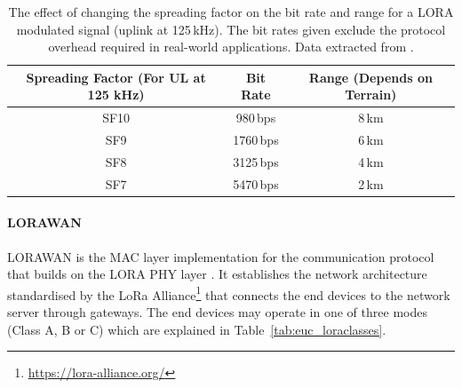 \begin{table}[h!]
    \centering
    \begin{tabular}{c c c}
    \hline
        \textbf{Spreading Factor} (For UL at 125 kHz) & \textbf{Bit Rate} & \textbf{Range} (Depends on Terrain) \\
    \hline
        SF10 & 980\,bps & 8\,km \\
        SF9 & 1760\,bps & 6\,km \\
        SF8 & 3125\,bps & 4\,km \\
        SF7 & 5470\,bps & 2\,km \\
    \hline
    \end{tabular}
    \caption[LoRa Spreading Factors' Effect on Bit Rate and Range]{The effect of changing the spreading factor on the bit rate and range for a \gls{LORA} modulated signal (uplink at 125\,kHz). The bit rates given exclude the protocol overhead required in real-world applications. Data extracted from \cite{semtech2024lora}.}
    \label{tab:euc_lorasf}
\end{table}

\paragraph{LORAWAN} \gls{LORAWAN} is the \gls{MAC} layer implementation for the communication protocol that builds on the \gls{LORA} \gls{PHY} layer \cite{semtech2024lora}. It establishes the network architecture standardised by the LoRa Alliance\footnote{\url{https://lora-alliance.org/}} that connects the end devices to the network server through gateways. The end devices may operate in one of three modes (Class A, B or C) which are explained in Table~\ref{tab:euc_loraclasses}. 

